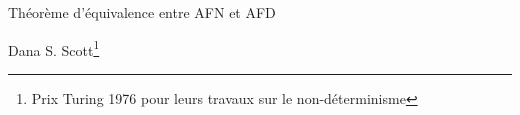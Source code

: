 \begin{frame}{Théorème d'équivalence entre AFN et AFD}
\begin{minipage}{2.7cm}
    Dana S. Scott\footnote[frame,1]{Prix Turing 1976 pour leurs travaux sur le non-déterminisme}
  \end{minipage}
\end{frame}

\endgroup
